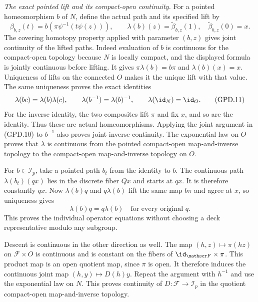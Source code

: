 \emph{The exact pointed lift and its compact-open continuity.}
For a pointed homeomorphism $b$ of $N$, define the actual path
and its specified lift by
\[
 \beta_{b,z}(t)=b\!\left(\pi\psi^{-1}(t\psi(z))\right),
 \qquad
 \lambda(b)(z)=\widetilde\beta_{b,z}(1),\quad
 \widetilde\beta_{b,z}(0)=x.
                                                               \tag{GPD.10}
\]
The covering homotopy property applied with parameter $(b,z)$
gives joint continuity of the lifted paths. Indeed evaluation
of $b$ is continuous for the compact-open topology because
$N$ is locally compact, and the displayed formula is jointly
continuous before lifting. It gives
$\pi\lambda(b)=b\pi$ and $\lambda(b)(x)=x$.
Uniqueness of lifts on the connected $O$ makes it the unique
lift with that value. The same uniqueness proves the exact
identities
\[
 \lambda(bc)=\lambda(b)\lambda(c),\qquad
 \lambda(b^{-1})=\lambda(b)^{-1},\qquad
 \lambda(\id_N)=\id_O.
                                                               \tag{GPD.11}
\]
For the inverse identity, the two composites lift $\pi$
and fix $x$, and so are the identity. Thus these are actual
homeomorphisms. Applying the joint argument in (GPD.10) to
$b^{-1}$ also proves joint inverse continuity.
The exponential law on $O$ proves that $\lambda$ is continuous
from the pointed compact-open map-and-inverse topology to
the compact-open map-and-inverse topology on $O$.

For $b\in\mathscr I_p$, take a pointed path $b_t$ from the
identity to $b$. The continuous path $\lambda(b_t)(qx)$
lies in the discrete fiber $Qx$ and starts at $qx$.
It is therefore constantly $qx$. Now
$\lambda(b)q$ and $q\lambda(b)$ lift the same map $b\pi$
and agree at $x$, so uniqueness gives
\[
                  \lambda(b)q=q\lambda(b)
                         \quad\text{for every original }q.
                                                               \tag{GPD.12}
\]
This proves the individual operator equations without choosing
a deck representative modulo any subgroup.

Descent is continuous in the other direction as well.
The map $(h,z)\mapsto\pi(hz)$ on $\mathscr F\times O$
is continuous and is constant on the fibers of
$\id_{\mathscr F}\times\pi$. This product map is an open
quotient map, since $\pi$ is open. It therefore induces
the continuous joint map $(h,y)\mapsto D(h)y$.
Repeat the argument with $h^{-1}$ and use the exponential
law on $N$. This proves continuity of
$D:\mathscr F\to\mathscr I_p$ in the quotient compact-open
map-and-inverse topology.

